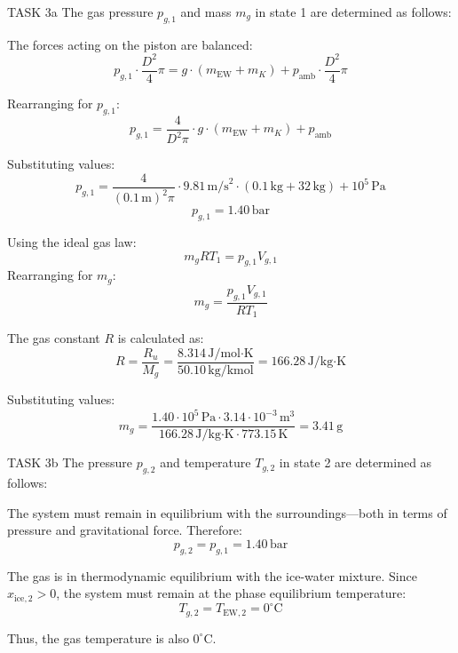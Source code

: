 TASK 3a  
The gas pressure \( p_{g,1} \) and mass \( m_g \) in state 1 are determined as follows:  

The forces acting on the piston are balanced:  
\[
p_{g,1} \cdot \frac{D^2}{4} \pi = g \cdot (m_{\text{EW}} + m_K) + p_{\text{amb}} \cdot \frac{D^2}{4} \pi
\]  

Rearranging for \( p_{g,1} \):  
\[
p_{g,1} = \frac{4}{D^2 \pi} \cdot g \cdot (m_{\text{EW}} + m_K) + p_{\text{amb}}
\]  

Substituting values:  
\[
p_{g,1} = \frac{4}{(0.1 \, \text{m})^2 \pi} \cdot 9.81 \, \text{m/s}^2 \cdot (0.1 \, \text{kg} + 32 \, \text{kg}) + 10^5 \, \text{Pa}
\]  
\[
p_{g,1} = 1.40 \, \text{bar}
\]  

Using the ideal gas law:  
\[
m_g R T_1 = p_{g,1} V_{g,1}
\]  
Rearranging for \( m_g \):  
\[
m_g = \frac{p_{g,1} V_{g,1}}{R T_1}
\]  

The gas constant \( R \) is calculated as:  
\[
R = \frac{R_u}{M_g} = \frac{8.314 \, \text{J/mol·K}}{50.10 \, \text{kg/kmol}} = 166.28 \, \text{J/kg·K}
\]  

Substituting values:  
\[
m_g = \frac{1.40 \cdot 10^5 \, \text{Pa} \cdot 3.14 \cdot 10^{-3} \, \text{m}^3}{166.28 \, \text{J/kg·K} \cdot 773.15 \, \text{K}} = 3.41 \, \text{g}
\]  

TASK 3b  
The pressure \( p_{g,2} \) and temperature \( T_{g,2} \) in state 2 are determined as follows:  

The system must remain in equilibrium with the surroundings—both in terms of pressure and gravitational force. Therefore:  
\[
p_{g,2} = p_{g,1} = 1.40 \, \text{bar}
\]  

The gas is in thermodynamic equilibrium with the ice-water mixture. Since \( x_{\text{ice},2} > 0 \), the system must remain at the phase equilibrium temperature:  
\[
T_{g,2} = T_{\text{EW},2} = 0^\circ \text{C}
\]  

Thus, the gas temperature is also \( 0^\circ \text{C} \).